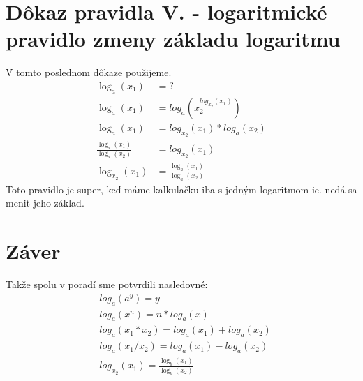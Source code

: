 \documentclass{article}
\begin{document}
\section*{Dôkaz pravidla V. - logaritmické pravidlo zmeny základu logaritmu}
V tomto poslednom dôkaze použijeme. \\
\begin{align}
\log_a(x_1) & = ? \\
\log_a(x_1) & = log_a(x_2^{log_{x_2}(x_1)}) \\
\log_a(x_1) & = log_{x_2}(x_1) * log_a(x_2) \\
\frac{\log_a(x_1)}{\log_a(x_2)} & = log_{x_2}(x_1) \\
\log_{x_2}(x_1) & = \frac{\log_a(x_1)}{\log_a(x_2)}
\end{align}
Toto pravidlo je super, keď máme kalkulačku iba s jedným logaritmom ie. nedá sa meniť jeho základ.


\section{Záver}
Takže spolu v poradí sme potvrdili nasledovné:
\begin{align}
	& log_a(a^y) = y \\
	& log_a(x^n) = n * log_a(x) \\
	& log_a(x_1 * x_2) = log_a(x_1) + log_a(x_2) \\
	& log_a(x_1/x_2) = log_a(x_1) - log_a(x_2) \\
	& log_{x_2}(x_1) = \frac{\log_b(x_1)}{\log_b(x_2)}
\end{align}
\end{document}
